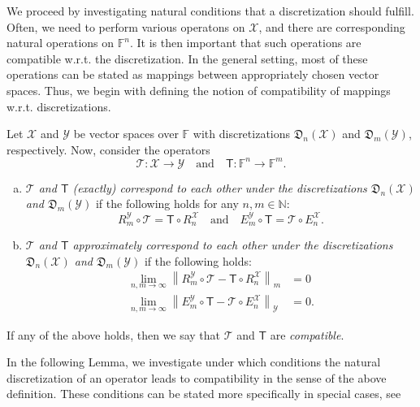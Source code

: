 \documentclass[a4paper]{paper}
\makeatletter
\newcommand{\Discr}{\mathfrak{D}}
\newcommand{\VecSpace}[1]{\mathscr{#1}}
\newcommand{\Field}{\mathbb{F}}
\newcommand{\Natural}{\mathbb{N}}
\newcommand{\Op}[1]{\mathcal{#1}}
\newcommand{\DiscOp}[1]{\mathsf{#1}}
\newcommand*{\EXT}[2]{\ensuremath{E_{#1}^{#2}}}
\newcommand*{\REST}[2]{\ensuremath{R_{#1}^{#2}}}
\newcommand*{\RnX}{\ensuremath{\REST{n}{\VecSpace{X}}}}
\newcommand*{\RmY}{\ensuremath{\REST{m}{\VecSpace{Y}}}}
\newcommand*{\EnX}{\ensuremath{\EXT{n}{\VecSpace{X}}}}
\newcommand*{\EmY}{\ensuremath{\EXT{m}{\VecSpace{Y}}}}
\newcommand{\wrt}{{w.r.t.}\@\xspace}
\newcommand*{\NORMLR}[1]{\ensuremath{\left\lVert #1 \right\rVert}}
\makeatother
\begin{document}
We proceed by investigating natural conditions that a discretization should fulfill. Often, we need to perform various operatons on 
$\VecSpace{X}$, and there are corresponding natural operations on $\Field^{n}$. It is then important that such operations are compatible 
\wrt the discretization. In the general setting, most of these operations can be stated as mappings between appropriately chosen vector 
spaces. Thus, we begin with defining the notion of compatibility of mappings \wrt discretizations. 
%
\begin{definition}
 \label{def:operator_compatibility}
 Let $\VecSpace{X}$ and $\VecSpace{Y}$ be vector spaces over $\Field$ with discretizations $\Discr_{n}(\VecSpace{X})$ and 
 $\Discr_{m}(\VecSpace{Y})$,   
 respectively. Now, consider the operators
 \begin{equation*}
  \Op{T} \colon \VecSpace{X} \to \VecSpace{Y} \quad\text{and}\quad \DiscOp{T} \colon \Field^{n} \to \Field^{m}.
 \end{equation*}
 \begin{enumerate}[(a)]
  \item \label{def:operator_compatibility:a_exact}
  \emph{$\Op{T}$ and $\DiscOp{T}$ (exactly) correspond to each 
  other under the discretizations $\Discr_{n}(\VecSpace{X})$ and  $\Discr_{m}(\VecSpace{Y})$} if 
  the following holds for any $n,m \in \Natural$:
  \begin{equation*}
   \RmY \circ \Op{T} = \DiscOp{T} \circ \RnX  \quad\text{and}\quad  \EmY \circ \DiscOp{T} = \Op{T} \circ \EnX.
  \end{equation*}

  \item \label{def:operator_compatibility:b_approximately}
  \emph{$\Op{T}$ and $\DiscOp{T}$ approximately correspond to each other under the discretizations $\Discr_{n}(\VecSpace{X})$  
  and $\Discr_{m}(\VecSpace{Y})$} if the following holds:
  \begin{align*} 
   \lim_{n,m\to \infty} \NORMLR{\RmY \circ \Op{T} - \DiscOp{T} \circ \RnX}_{m} &= 0  \\[0.5em]
   \lim_{n,m\to \infty} \NORMLR{\EmY \circ \DiscOp{T} - \Op{T} \circ \EnX}_{\VecSpace{Y}} &= 0.
  \end{align*}
 \end{enumerate}  
 If any of the above holds, then we say that $\Op{T}$ and $\DiscOp{T}$ are \emph{compatible}.
\end{definition}

In the following Lemma, we investigate under which conditions the natural discretization of an operator leads to compatibility in the sense 
of the above definition. These conditions can be stated more specifically in special cases, see 
\end{document}
